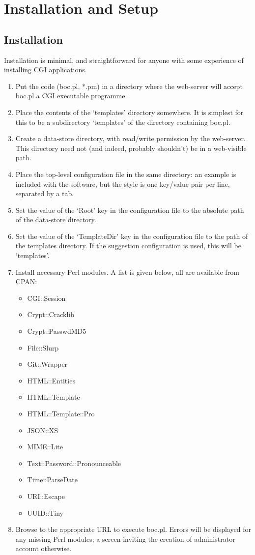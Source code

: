 \documentclass{report}
\begin{document}
\chapter{Installation and Setup}

\section{Installation}

Installation is minimal, and straightforward for anyone with some experience of installing CGI applications.

\begin{enumerate}
\item Put the code (boc.pl, *.pm) in a directory where the web-server will accept boc.pl a CGI executable programme.
\item Place the contents of the `templates' directory somewhere.  It is simplest for this to be a subdirectory `templates' of the directory containing boc.pl.
\item Create a data-store directory, with read/write permission by the web-server.  This directory need not (and indeed, probably shouldn't) be in a web-visible path.
\item Place the top-level configuration file in the same directory: an example is included with the software, but the style is one key/value pair per line, separated by a tab.
\item Set the value of the `Root' key in the configuration file to the absolute path of the data-store directory.
\item Set the value of the `TemplateDir' key in the configuration file to the path of the templates directory.  If the suggestion configuration is used, this will be `templates'.
\item Install necessary Perl modules.  A list is given below, all are available from CPAN:
	\begin{itemize}
	\item CGI::Session
	\item Crypt::Cracklib
	\item Crypt::PasswdMD5
	\item File::Slurp
	\item Git::Wrapper
	\item HTML::Entities
	\item HTML::Template
	\item HTML::Template::Pro
	\item JSON::XS
	\item MIME::Lite
	\item Text::Password::Pronounceable
	\item Time::ParseDate
	\item URI::Escape
	\item UUID::Tiny
	\end{itemize}
\item Browse to the appropriate URL to execute boc.pl.  Errors will be displayed for any missing Perl modules; a screen inviting the creation of administrator account otherwise.
\end{enumerate}
\end{document}
